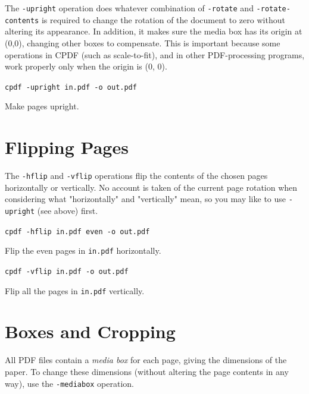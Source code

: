\documentclass{book}
\begin{document}
  \label{upright}
   \noindent The \texttt{-upright} operation does whatever combination of
\texttt{-rotate} and \texttt{-rotate-contents} is required to change the
rotation of the document to zero without altering its appearance. In addition, it makes sure the media box has its origin at (0,0), changing other boxes to compensate. This is important because some operations in CPDF (such as scale-to-fit), and in other PDF-processing programs, work properly only when the origin is (0, 0).

  \begin{framed}
  \noindent\small\verb!cpdf -upright in.pdf -o out.pdf!

  \vspace{2.5mm}

  \noindent Make pages upright.
  \end{framed}

  \section{Flipping Pages}
  The \texttt{-hflip} and \texttt{-vflip} operations flip the contents of the
chosen pages horizontally or vertically. No account is taken of the current
page rotation when considering what "horizontally" and "vertically" mean, so you may like to use \texttt{-upright} (see above) first.

  \begin{framed}
    \noindent\small\verb!cpdf -hflip in.pdf even -o out.pdf!

    \vspace{2.5mm}
    \noindent Flip the even pages in \texttt{in.pdf} horizontally.

    \vspace{2.5mm}
    \noindent\verb!cpdf -vflip in.pdf -o out.pdf!

    \vspace{2.5mm}
    \noindent Flip all the pages in \texttt{in.pdf} vertically.
  \end{framed}

  \section{Boxes and Cropping}
  All PDF files contain a \textit{media box} for each page, giving the
dimensions of the paper. To change these dimensions (without altering the page
contents in any way), use the \texttt{-mediabox} operation.
\end{document}
